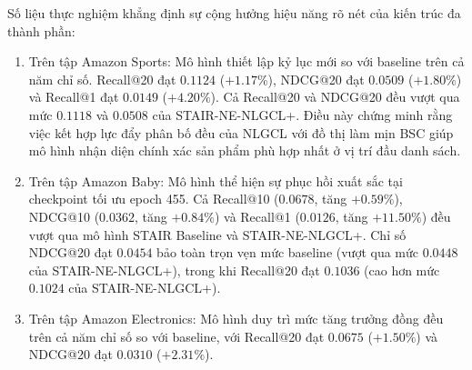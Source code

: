 Số liệu thực nghiệm khẳng định sự cộng hưởng hiệu năng rõ nét của kiến trúc đa thành phần:
\begin{enumerate}[leftmargin=*]
    \item Trên tập Amazon Sports: Mô hình thiết lập kỷ lục mới so với baseline trên cả năm chỉ số. Recall@20 đạt $0.1124$ ($+1.17\%$), NDCG@20 đạt $0.0509$ ($+1.80\%$) và Recall@1 đạt $0.0149$ ($+4.20\%$). Cả Recall@20 và NDCG@20 đều vượt qua mức $0.1118$ và $0.0508$ của STAIR-NE-NLGCL+. Điều này chứng minh rằng việc kết hợp lực đẩy phân bố đều của NLGCL với đồ thị làm mịn BSC giúp mô hình nhận diện chính xác sản phẩm phù hợp nhất ở vị trí đầu danh sách.
    \item Trên tập Amazon Baby: Mô hình thể hiện sự phục hồi xuất sắc tại checkpoint tối ưu epoch 455. Cả Recall@10 ($0.0678$, tăng $+0.59\%$), NDCG@10 ($0.0362$, tăng $+0.84\%$) và Recall@1 ($0.0126$, tăng $+11.50\%$) đều vượt qua mô hình STAIR Baseline và STAIR-NE-NLGCL+. Chỉ số NDCG@20 đạt $0.0454$ bảo toàn trọn vẹn mức baseline (vượt qua mức $0.0448$ của STAIR-NE-NLGCL+), trong khi Recall@20 đạt $0.1036$ (cao hơn mức $0.1024$ của STAIR-NE-NLGCL+).
    \item Trên tập Amazon Electronics: Mô hình duy trì mức tăng trưởng đồng đều trên cả năm chỉ số so với baseline, với Recall@20 đạt $0.0675$ ($+1.50\%$) và NDCG@20 đạt $0.0310$ ($+2.31\%$).
\end{enumerate}

